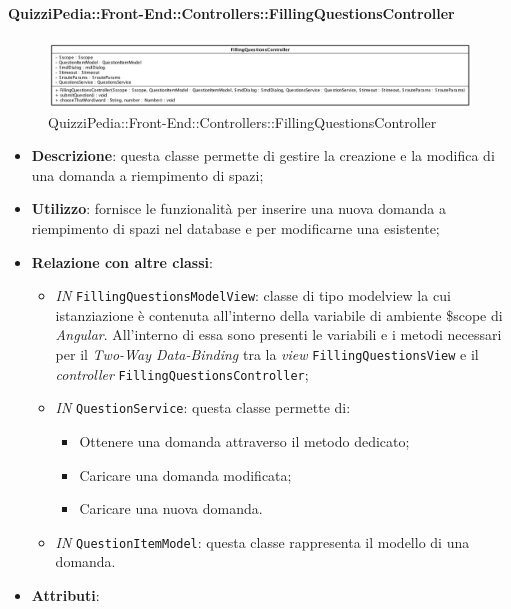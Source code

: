 \paragraph{QuizziPedia::Front-End::Controllers::FillingQuestionsController}
\begin{figure} [ht]
	\centering
	\includegraphics[scale=0.40]{UML/Classi/Front-End/QuizziPedia_Front-end_Controller_FillingQuestionsController.png}
	\caption{QuizziPedia::Front-End::Controllers::FillingQuestionsController}
\end{figure} \FloatBarrier
\begin{itemize}
	\item \textbf{Descrizione}: questa classe permette di gestire la creazione e la modifica di una domanda a riempimento di spazi;
	\item \textbf{Utilizzo}: fornisce le funzionalità per inserire una nuova domanda a riempimento di spazi nel database e per modificarne una esistente;
	\item \textbf{Relazione con altre classi}:
	\begin{itemize}
		\item \textit{IN} \texttt{FillingQuestionsModelView}: classe di tipo modelview la cui istanziazione è contenuta all'interno della variabile di ambiente \$scope di \textit{Angular}. All'interno di essa sono presenti le variabili e i metodi necessari per il \textit{Two-Way Data-Binding} tra la \textit{view} \texttt{FillingQuestionsView} e il \textit{controller} \texttt{FillingQuestionsController};
		\item \textit{IN} \texttt{QuestionService}: questa classe permette di:
		\begin{itemize}
			\item Ottenere una domanda attraverso il metodo dedicato;
			\item Caricare una domanda modificata;
			\item Caricare una nuova domanda.
		\end{itemize}
		\item \textit{IN} \texttt{QuestionItemModel}: questa classe rappresenta il modello di una domanda.
	\end{itemize}
	\item \textbf{Attributi}:
	\begin{itemize}

\end{itemize}
\end{itemize}
